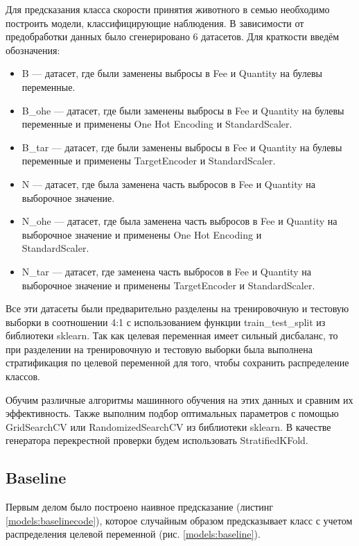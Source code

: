 \documentclass[14pt]{mmcs_article}
\begin{document}
Для предсказания класса скорости принятия животного в семью необходимо построить модели, классифицирующие наблюдения. В зависимости от предобработки данных было сгенерировано 6 датасетов. Для краткости введём обозначения: 

\begin{itemize}
	\item B --- датасет, где были заменены выбросы в Fee и Quantity на булевы переменные.
	\item B\_ohe --- датасет, где были заменены выбросы в Fee и Quantity на булевы переменные и применены One Hot Encoding и StandardScaler.
	\item B\_tar --- датасет, где были заменены выбросы в Fee и Quantity на булевы переменные и применены TargetEncoder и StandardScaler.
	\item N — датасет, где была заменена часть выбросов в Fee и Quantity на выборочное значение. 
	\item N\_ohe --- датасет, где была заменена часть выбросов в Fee и Quantity на выборочное значение и применены One Hot Encoding и \\ StandardScaler.
	\item N\_tar --- датасет, где заменена часть выбросов в Fee и Quantity на выборочное значение и применены TargetEncoder и StandardScaler.
\end{itemize}

Все эти датасеты были предварительно разделены на тренировочную и тестовую выборки в соотношении 4:1 с использованием функции train\_test\_split из библиотеки sklearn. Так как целевая переменная имеет сильный дисбаланс, то при разделении на тренировочную и тестовую выборки была выполнена стратификация по целевой переменной для того, чтобы сохранить распределение классов.

Обучим различные алгоритмы машинного обучения на этих данных и сравним их эффективность. Также выполним подбор оптимальных параметров с помощью GridSearchCV или RandomizedSearchCV из библиотеки sklearn. В качестве генератора перекрестной проверки будем использовать StratifiedKFold.


\subsection{Baseline}

Первым делом было построено наивное предсказание (листинг \ref{models:baselinecode}), которое случайным образом предсказывает класс с учетом распределения целевой переменной (рис. \ref{models:baseline}).
\end{document}
